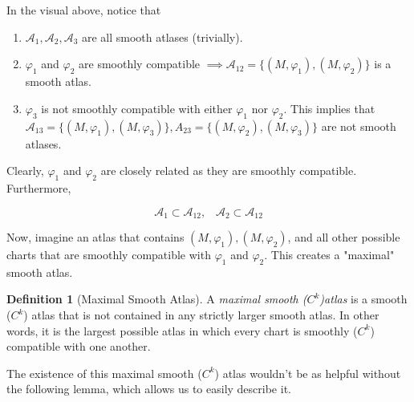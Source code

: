 \documentclass{article}
\theoremstyle{remark}
\theoremstyle{definition}
\newtheorem{definition}{Definition}[section]
\begin{document}
    In the visual above, notice that

    \begin{enumerate}
      \item $\mathcal{A}_1, \mathcal{A}_2, \mathcal{A}_3$ are all smooth atlases (trivially).
      \item $\varphi_1$ and $\varphi_2$ are smoothly compatible $\implies \mathcal{A}_{12} = \{(M, \varphi_1), (M, \varphi_2)\}$ is a smooth atlas. 
      \item $\varphi_3$ is not smoothly compatible with either $\varphi_1$ nor $\varphi_2$. This implies that $\mathcal{A}_{13} = \{(M, \varphi_1), (M, \varphi_3)\}, A_{23} = \{(M, \varphi_2), (M, \varphi_3)\}$ are not smooth atlases.
    \end{enumerate}

    Clearly, $\varphi_1$ and $\varphi_2$ are closely related as they are smoothly compatible. Furthermore, 

      \[\mathcal{A}_1 \subset \mathcal{A}_{12}, \;\;\; \mathcal{A}_2 \subset \mathcal{A}_{12}\]

    Now, imagine an atlas that contains $(M, \varphi_1), (M,\varphi_2)$, and all other possible charts that are smoothly compatible with $\varphi_1$ and $\varphi_2$. This creates a "maximal" smooth atlas. 

    \begin{definition}[Maximal Smooth Atlas]
      A \textit{maximal smooth ($C^k$)atlas} is a smooth ($C^k$) atlas that is not contained in any strictly larger smooth atlas. In other words, it is the largest possible atlas in which every chart is smoothly ($C^k$) compatible with one another. 
    \end{definition}

    The existence of this maximal smooth ($C^k$) atlas wouldn't be as helpful without the following lemma, which allows us to easily describe it. 
\end{document}
